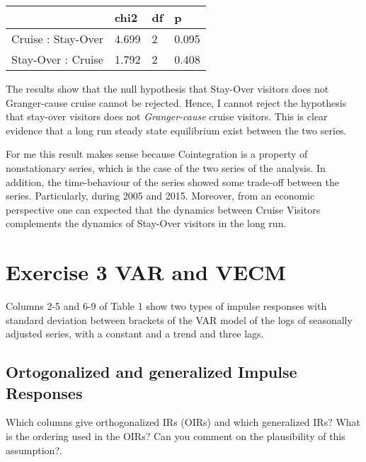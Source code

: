\documentclass[11pt]{article}
\begin{document}
\begin{table} \centering
{} \label{tab:granger} 
        \begin{tabular}{l|P{2.5cm}|P{2.5cm}|P{2.5cm}}
\toprule
	& chi2	& df & 	p \\
\midrule	
Cruise : Stay-Over &	4.699 &	2 &	0.095 \\
\hline
Stay-Over : Cruise &	1.792 &	2	& 0.408  \\
\bottomrule
\end{tabular}
\end{table}

The results show that the null hypothesis that Stay-Over visitors does not Granger-cause cruise cannot be rejected. Hence, I cannot reject the hypothesis that stay-over visitors does not \textit{Granger-cause} cruise visitors. This is clear evidence that a long run steady state equilibrium exist between the two series.

For me this result makes sense because Cointegration is a property of nonstationary series, which is the case of the two series of the analysis. In addition, the time-behaviour of the series showed some trade-off between the series. Particularly, during 2005 and 2015. Moreover, from an economic perspective one can expected that the dynamics between Cruise Visitors complements the dynamics of Stay-Over visitors in the long run.







\newpage
\section{Exercise 3 VAR and VECM}

Columns 2-5 and 6-9 of Table 1 show two types of impulse responses with standard deviation between brackets of the VAR model of the logs of seasonally adjusted series, with a constant and a trend and three lags.

\subsection{Ortogonalized and generalized Impulse Responses}
Which columns give orthogonalized IRs (OIRs) and which generalized IRs? What is the ordering used in the OIRs? Can you comment on the plausibility of this assumption?. \\
\end{document}
